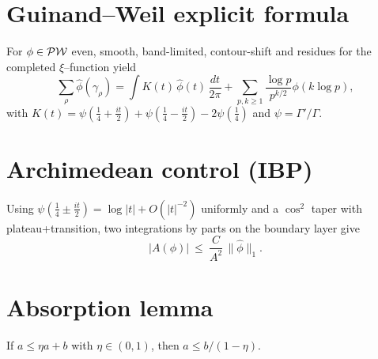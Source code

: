 \section{Guinand–Weil explicit formula}\label{sec:GW-full}
For $\phi\in\mathcal{PW}$ even, smooth, band-limited, contour-shift and residues for the completed $\xi$–function yield
\[
\sum_{\rho}\hat\phi(\gamma_\rho)
=\int K(t)\,\hat\phi(t)\,\frac{dt}{2\pi}
+\sum_{p,k\ge 1}\frac{\log p}{p^{k/2}}\phi(k\log p),
\]
with $K(t)=\psi(\tfrac14+\tfrac{it}{2})+\psi(\tfrac14-\tfrac{it}{2})-2\psi(\tfrac14)$ and $\psi=\Gamma'/\Gamma$.

\section{Archimedean control (IBP)}
Using $\psi(\tfrac14\pm \tfrac{it}{2})=\log|t|+O(|t|^{-2})$ uniformly and a $\cos^2$ taper with plateau+transition,
two integrations by parts on the boundary layer give
\[
|A(\phi)|\ \le\ \frac{C}{A^2}\,\|\hat\phi\|_1.
\]
\section{Absorption lemma}
If $a\le \eta a + b$ with $\eta\in(0,1)$, then $a\le b/(1-\eta)$.
